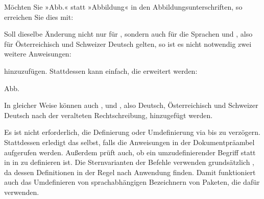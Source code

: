 \begin{Example}
  Möchten Sie »Abb.« statt »Abbildung« in den Abbildungsunterschriften, so
  erreichen Sie dies mit:
\begin{lstcode}
\end{lstcode}

  Soll dieselbe Änderung nicht nur für , sondern
  auch für die Sprachen  und , also für
  Österreichisch und Schweizer Deutsch gelten, so ist
  es nicht notwendig zwei weitere Anweisungen:
\begin{lstcode}
\end{lstcode}
  hinzuzufügen. Stattdessen kann einfach, die  erweitert
  werden:
\begin{lstcode}
                   {\figurename}{Abb.}
\end{lstcode}
  In gleicher Weise können auch ,  und
  , also Deutsch, Österreichisch und Schweizer Deutsch
  nach der veralteten Rechtschreibung, hinzugefügt werden.
\end{Example}

Es ist nicht erforderlich, die Definierung
oder Umdefinierung via  bis
 zu verzögern. Stattdessen erledigt
 das selbst, falls die Anweisungen in der Dokumentpräambel
aufgerufen werden. Außerdem prüft  auch, ob ein
umzudefinierender Begriff statt in  in
 zu definieren ist. Die Sternvarianten der
Befehle verwenden grundsätzlich , da dessen
Definitionen in der Regel nach  Anwendung
finden. Damit funktioniert auch das Umdefinieren von sprachabhängigen
Bezeichnern von Paketen, die dafür
 verwenden.

